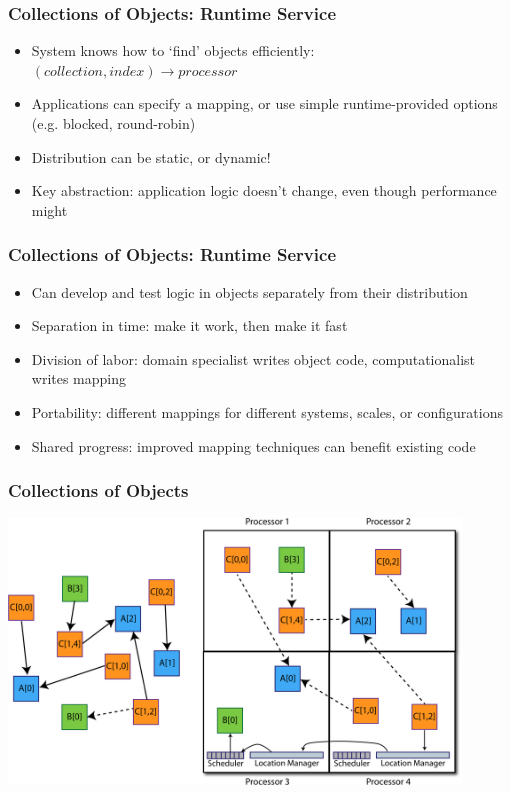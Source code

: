 \begin{frame}[fragile]
  \frametitle{Collections of Objects: Runtime Service}
  \begin{itemize}
    \item System knows how to `find' objects efficiently: $(collection, index) \to processor$
    \item Applications can specify a mapping, or use simple
      runtime-provided options (e.g. blocked, round-robin)
    \item Distribution can be static, or dynamic!
    \item Key abstraction: application logic doesn't change, even
      though performance might
  \end{itemize}
\end{frame}

\begin{frame}[fragile]
  \frametitle{Collections of Objects: Runtime Service}
  \begin{itemize}
    \item Can develop and test logic in objects separately from their distribution
    \item Separation in time: make it work, then make it fast
    \item Division of labor: domain specialist writes object code, computationalist writes mapping
    \item Portability: different mappings for different systems, scales, or configurations
    \item Shared progress: improved mapping techniques can benefit existing code
  \end{itemize}
\end{frame}

\begin{frame}[fragile]
  \frametitle{Collections of Objects}
  \begin{center}\includegraphics[width=0.9\textwidth]{figures/elements2.pdf}\end{center}
\end{frame}

